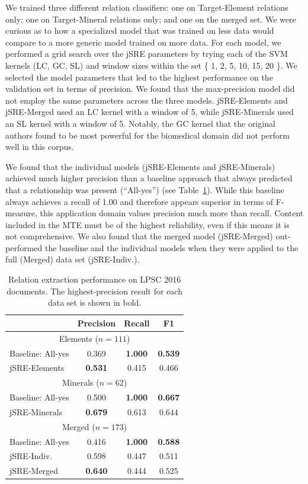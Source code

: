 \documentclass[letterpaper]{article} %
\begin{document}
We trained three different relation classifiers: one on Target-Element
relations only; one on Target-Mineral relations only; and one on the
merged set.  We were curious as to how a specialized model that was
trained on less data would compare to a more generic model trained on
more data.  For each model, we performed a grid search over the jSRE
parameters by trying each of the SVM kernels (LC, GC, SL) and window
sizes within the set \{ 1, 2, 5, 10, 15, 20 \}.  We selected the model
parameters that led to the highest performance on the validation set
in terms of precision.  We found that the max-precision model did not
employ the same parameters across the three models.  jSRE-Elements and
jSRE-Merged used an LC kernel with a window of 5, while jSRE-Minerals
used an SL kernel with a window of 5.  Notably, the GC kernel that the
original authors found to be most powerful for the biomedical domain
did not perform well in this corpus.

We found that the individual models (jSRE-Elements and jSRE-Minerals)
achieved much higher precision than a baseline approach that always
predicted that a relationship was present (``All-yes'') (see
Table~\ref{tab:re}).  While this baseline always achieves a recall of
1.00 and therefore appears superior in terms of F-measure, this
application domain values precision much more than recall.  Content
included in the MTE must be of the highest reliability, even if
this means it is not comprehensive.  
%
We also found that the merged model (jSRE-Merged) out-performed the
baseline and the individual models when they were applied to the full
(Merged) data set (jSRE-Indiv.). 


\begin{table}
\caption{Relation extraction performance on LPSC 2016 documents. 
The highest-precision result for each data set is shown in bold.}
\label{tab:re}
\begin{center}
\begin{tabular}{l|ccc}
 & Precision & Recall & F1 \\ \hline
\multicolumn{4}{c}{Elements ($n=111$)} \\
Baseline: All-yes & 0.369 & {\bf 1.000} & {\bf 0.539} \\ 
jSRE-Elements & {\bf 0.531} & 0.415 & 0.466 \\ \hline
\multicolumn{4}{c}{Minerals ($n=62$)} \\
Baseline: All-yes & 0.500 & {\bf 1.000} & {\bf 0.667} \\ 
jSRE-Minerals & {\bf 0.679} & 0.613 & 0.644 \\ \hline 
\multicolumn{4}{c}{Merged ($n=173$)} \\
Baseline: All-yes & 0.416 & {\bf 1.000} & {\bf 0.588} \\ 
jSRE-Indiv.  & 0.598 & 0.447 & 0.511 \\
jSRE-Merged  & {\bf 0.640} & 0.444 & 0.525 \\ \hline
\end{tabular}
\end{center}
\end{table}
\end{document}
